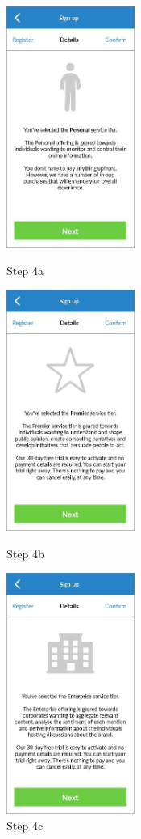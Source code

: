 \begin{figure}
  \subfigures
  \centering
  \begin{minipage}{4.6cm}
    \centering
    \includegraphics[width=4.2cm]{inc/ui_reg_step4a.jpg}
    \caption{Step 4a}
    \label{fig:ui_reg_step4a}
  \end{minipage}
  \begin{minipage}{4.6cm}
    \centering
    \includegraphics[width=4.2cm]{inc/ui_reg_step4b.jpg}
    \caption{Step 4b}
    \label{fig:ui_reg_step4b}
  \end{minipage}
  \begin{minipage}{4.6cm}
    \centering
    \includegraphics[width=4.2cm]{inc/ui_reg_step4c.jpg}
    \caption{Step 4c}
    \label{fig:ui_reg_step4c}
  \end{minipage}
\end{figure}

